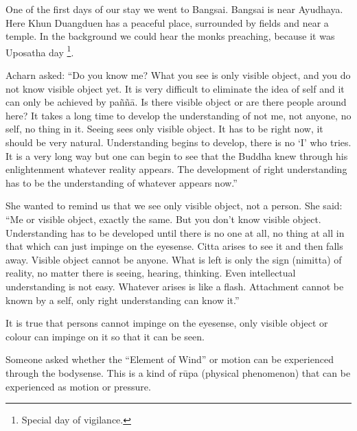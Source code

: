 One of the first days of our stay we went to Bangsai. Bangsai is near
Ayudhaya. Here Khun Duangduen has a peaceful place, surrounded by fields
and near a temple. In the background we could hear the monks preaching,
because it was Uposatha day
\footnote{Special day of
vigilance.}.

Acharn asked: ``Do you know me? What you see is only visible object, and
you do not know visible object yet. It is very difficult to eliminate
the idea of self and it can only be achieved by paññā. Is there visible
object or are there people around here? It takes a long time to develop
the understanding of not me, not anyone, no self, no thing in it. Seeing
sees only visible object. It has to be right now, it should be very
natural. Understanding begins to develop, there is no `I' who tries. It
is a very long way but one can begin to see that the Buddha knew through
his enlightenment whatever reality appears. The development of right
understanding has to be the understanding of whatever appears now.''

She wanted to remind us that we see only visible object, not a person.
She said: ``Me or visible object, exactly the same. But you don't know
visible object. Understanding has to be developed until there is no one
at all, no thing at all in that which can just impinge on the eyesense.
Citta arises to see it and then falls away. Visible object cannot be
anyone. What is left is only the sign (nimitta) of reality, no matter
there is seeing, hearing, thinking. Even intellectual understanding is
not easy. Whatever arises is like a flash. Attachment cannot be known by
a self, only right understanding can know it.''

It is true that persons cannot impinge on the eyesense, only visible
object or colour can impinge on it so that it can be seen.

Someone asked whether the ``Element of Wind'' or motion can be
experienced through the bodysense. This is a kind of rūpa (physical
phenomenon) that can be experienced as motion or pressure.

